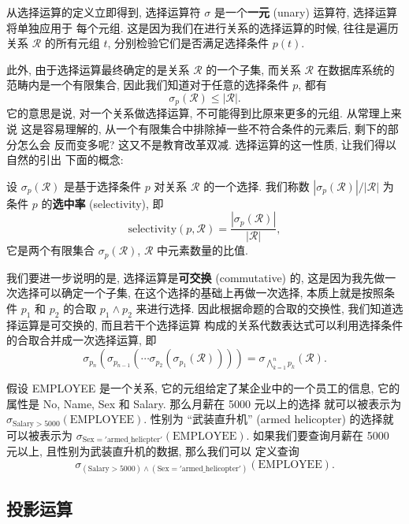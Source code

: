 \documentclass[10pt,UTF8]{book} %
\begin{document}
从选择运算的定义立即得到,
选择运算符 $\sigma$ 是一个\textbf{一元} (unary) 运算符, 选择运算将单独应用于
每个元组. 这是因为我们在进行关系的选择运算的时候, 往往是遍历关系 $\mathcal{R}$
的所有元组 $t$, 分别检验它们是否满足选择条件 $p(t)$.

此外, 由于选择运算最终确定的是关系 $\mathcal{R}$ 的一个子集, 而关系 $\mathcal{R}$
在数据库系统的范畴内是一个有限集合, 因此我们知道对于任意的选择条件 $p$, 都有
\[ \sigma_p(\mathcal{R}) \leqslant |\mathcal{R}|. \]
它的意思是说, 对一个关系做选择运算, 不可能得到比原来更多的元组. 从常理上来说
这是容易理解的, 从一个有限集合中排除掉一些不符合条件的元素后, 剩下的部分怎么会
反而变多呢? 这又不是教育改革双减. 选择运算的这一性质, 让我们得以自然的引出
下面的概念:

\begin{definition}[选中率]
    设 $\sigma_p(\mathcal{R})$ 是基于选择条件 $p$ 对关系 $\mathcal{R}$
    的一个选择. 我们称数 $|\sigma_p(\mathcal{R})|/|\mathcal{R}|$
    为条件 $p$ 的\textbf{选中率} (selectivity), 即
    \[ \mathrm{selectivity}(p,\mathcal{R}) =
    \dfrac{|\sigma_p(\mathcal{R})|}{|\mathcal{R}|}, \]
    它是两个有限集合 $\sigma_p(\mathcal{R})$, $\mathcal{R}$ 中元素数量的比值.
\end{definition}

我们要进一步说明的是, 选择运算是\textbf{可交换} (commutative) 的,
这是因为我先做一次选择可以确定一个子集, 在这个选择的基础上再做一次选择,
本质上就是按照条件 $p_1$ 和 $p_2$ 的合取 $p_1 \wedge p_2$ 来进行选择.
因此根据命题的合取的交换性, 我们知道选择运算是可交换的, 而且若干个选择运算
构成的关系代数表达式可以利用选择条件的合取合并成一次选择运算, 即
\[ \sigma_{p_n}(\sigma_{p_{n-1}}(\cdots \sigma_{p_2}(\sigma_{p_1}(\mathcal{R}))))
= \sigma_{\bigwedge_{k=1}^n p_k}(\mathcal{R}). \]

\begin{example}
    假设 EMPLOYEE 是一个关系, 它的元组给定了某企业中的一个员工的信息,
    它的属性是 No, Name, Sex 和 Salary. 那么月薪在 5000 元以上的选择
    就可以被表示为 $\sigma_{\mathrm{Salary} > 5000}(\mathrm{EMPLOYEE})$.
    性别为 “武装直升机” (armed helicopter) 的选择就可以被表示为
    $\sigma_{\mathrm{Sex} = \mathrm{'armed\_helicpter'}}(\mathrm{EMPLOYEE})$.
    如果我们要查询月薪在 5000 元以上, 且性别为武装直升机的数据, 那么我们可以
    定义查询 \[ \sigma_{(\mathrm{Salary} > 5000)
    \wedge(\mathrm{Sex = 'armed\_helicopter'})}(\mathrm{EMPLOYEE}). \]
\end{example}

\subsection{投影运算}
\end{document}
